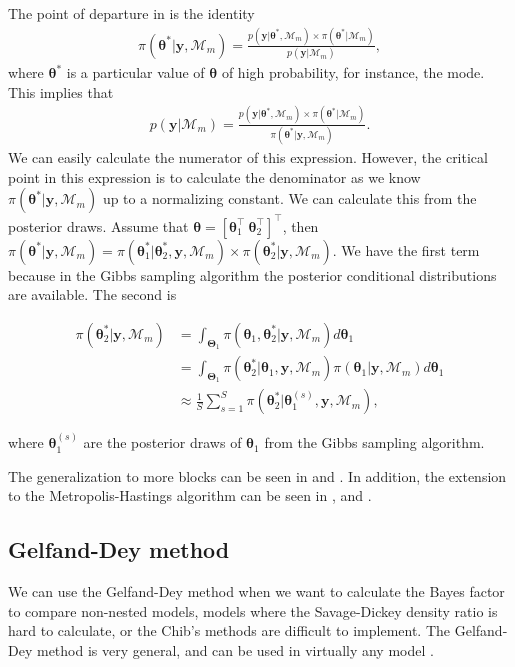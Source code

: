 The point of departure in \cite{chib1995marginal} is the identity
\begin{align*}
	\pi(\bm{\theta}^*|\bm{y},\mathcal{M}_m)=\frac{p(\bm{y}|\bm{\theta}^*,\mathcal{M}_m)\times\pi(\bm{\theta}^*|\mathcal{M}_m)}{p(\bm{y}|\mathcal{M}_m)},
\end{align*} 
where $\bm{\theta}^*$ is a particular value of $\bm{\theta}$ of high probability, for instance, the mode. This implies that
\begin{align*}
	p(\bm{y}|\mathcal{M}_m)=\frac{p(\bm{y}|\bm{\theta}^*,\mathcal{M}_m)\times\pi(\bm{\theta}^*|\mathcal{M}_m)}{\pi(\bm{\theta}^*|\bm{y},\mathcal{M}_m)}.
\end{align*} 
We can easily calculate the numerator of this expression. However, the critical point in this expression is to calculate the denominator as we know $\pi(\bm{\theta}^*|\bm{y},\mathcal{M}_m)$ up to a normalizing constant. We can calculate this from the posterior draws. Assume that $\bm{\theta}=[\bm{\theta}^{\top}_1 \ \bm{\theta}^{\top}_2]^{\top}$, then $\pi(\bm{\theta}^*|\bm{y},\mathcal{M}_m)=\pi(\bm{\theta}^*_1|\bm{\theta}^*_2,\bm{y},\mathcal{M}_m)\times \pi(\bm{\theta}^*_2|\bm{y},\mathcal{M}_m)$. We have the first term because in the Gibbs sampling algorithm the posterior conditional distributions are available. The second is

\begin{align*}
	\pi(\bm{\theta}^*_2|\bm{y},\mathcal{M}_m)&=\int_{\bm{\Theta}_1}\pi(\bm{\theta}_1,\bm{\theta}^*_2|\bm{y},\mathcal{M}_m)d\bm{\theta}_1\\
	&=\int_{\bm{\Theta}_1}\pi(\bm{\theta}^*_2|\bm{\theta}_1,\bm{y},\mathcal{M}_m)\pi(\bm{\theta}_1|\bm{y},\mathcal{M}_m)d\bm{\theta}_1\\
	&\approx \frac{1}{S}\sum_{s=1}^S \pi(\bm{\theta}^*_2|\bm{\theta}^{(s)}_1,\bm{y},\mathcal{M}_m),
\end{align*} 

where $\bm{\theta}^{(s)}_1$ are the posterior draws of $\bm{\theta}_1$ from the Gibbs sampling algorithm. 

The generalization to more blocks can be seen in \cite{chib1995marginal} and \cite[Chap.~7]{greenberg2012introduction}. In addition, the extension to the Metropolis-Hastings algorithm can be seen in \cite{chib2001marginal}, and \cite[Chap.~7]{greenberg2012introduction}.

\subsection{Gelfand-Dey method}\label{sec10_4_3}
We can use the Gelfand-Dey method \cite{gelfand1994bayesian} when we want to calculate the Bayes factor to compare non-nested models, models where the Savage-Dickey density ratio is hard to calculate, or the Chib's methods are difficult to implement. The Gelfand-Dey method is very general, and can be used in virtually any model \cite[Chap.~5]{koop2003bayesian}.

